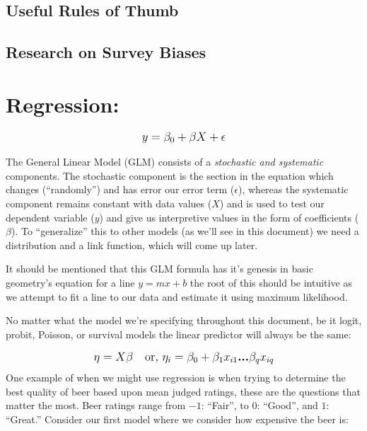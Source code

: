 \documentclass[12pt]{article}\usepackage[]{graphicx}\usepackage[]{color}
\begin{document}
\begin{flushleft}
\subsection{Useful Rules of Thumb}

\subsection{Research on Survey Biases}


\clearpage










\clearpage
\section{Regression:}

\begin{equation}
\mathlarger{ y = \beta_0 + \beta X + \epsilon }
\end{equation}

The General Linear Model (GLM) consists of a \textit{stochastic and systematic} components. The stochastic component is the section in the equation which changes (``randomly'') and has error our error term ($\epsilon$), whereas the systematic component remains constant with data values ($X$) and is used to test our dependent variable ($y$) and give us interpretive values in the form of coefficients ($\beta$). To ``generalize'' this to other models (as we'll see in this document) we need a distribution and a link function, which will come up later.

It should be mentioned that this GLM formula has it's genesis in basic geometry's equation for a line $y=mx + b$ the root of this should be intuitive as we attempt to fit a line to our data and estimate it using maximum likelihood.

No matter what the model we're specifying throughout this document, be it logit, probit, Poisson, or survival models the linear predictor will always be the same:

\begin{equation}
\mathlarger{ \eta = X\beta \text{ \text{  }  or,  }}
\mathlarger{ \eta_i = \beta_0 + \beta_1 x_{i1} \textbf{...} \beta_q x_{iq}  }
\end{equation}
One example of when we might use regression is when trying to determine the best quality of beer based upon mean judged ratings, these are the questions that matter the most. Beer ratings range from $-1$: ``Fair'', to $0$: ``Good'', and $1$: ``Great.'' Consider our first model where we consider how expensive the beer is:


\end{flushleft}
\end{document}

